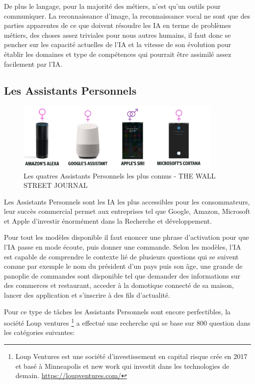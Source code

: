 De plus le langage, pour la majorité des métiers, n'est qu'un outils pour communiquer. La reconnaissance
d'image, la reconnaissance vocal ne sont que des parties apparentes de ce que doivent résoudre les IA
en terme de problèmes métiers, des choses assez triviales pour nous autres humains, il faut donc se pencher
sur les capacité actuelles de l'IA et la vitesse de son évolution pour établir les domaines
et type de compétences qui pourrait être assimilé assez facilement par l'IA. \newline

\subsection{Les Assistants Personnels}
\begin{figure}[h]
    \centering
    \includegraphics[width=0.9\textwidth]{Images/virtualassistant}
    \caption{Les quatres Assistants Personnels les plus connus - THE WALL STREET JOURNAL}
    \label{fig:mostknownvirtualassistant}
\end{figure}

Les Assistants Personnels sont les IA les plus accessibles pour les consommateurs, leur succès commercial
permet aux entreprises tel que Google, Amazon, Microsoft et Apple d'investir énormément
dans la Recherche et développement.

Pour tout les modèles disponible il faut enoncer une phrase d'activation pour que
l'IA passe en mode écoute, puis donner une commande. Selon les modèles, l'IA
est capable de comprendre le contexte lié de plusieurs questions qui se suivent
comme par exemple le nom du président d'un pays puis son âge, une grande de panoplie de
commandes sont disponible tel que demander des informations sur des commerces et restaurant,
acceder à la domotique connecté de sa maison, lancer des application et s'inscrire à des fils
d'actualité.

Pour ce type de tâches les Assistants Personnels sont encore perfectibles,
la société Loup ventures
\footnote{ Loup Ventures est une société d'investissement en capital risque crée en 2017 et
basé à Minneapolis et new work qui investit dans les technologies de demain. \newline
\url{https://loupventures.com/} }
a effectué une recherche qui se base sur 800 question dans les
catégories suivantes: \newline

